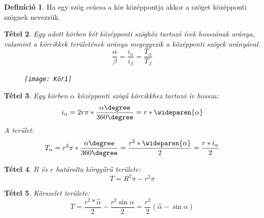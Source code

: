 \documentclass[twoside,12pt]{report}
\newtheorem{theorem}{Tétel}[section]
\theoremstyle{definition}
\newtheorem{definition}[theorem]{Definíció}
\begin{document}
	\begin{definition}
		Ha egy szög csúcsa a kör középpontja akkor a szöget középponti szögnek nevezzük.
	\end{definition}
	\begin{theorem}
		Egy adott körben két középponti szöghöz tartozó ívek hosszának aránya, valamint a körcikkek
		területének aránya megegyezik a középponti szögek arányával.
		\begin{equation*}
			\frac{\alpha}{\beta}=\frac{i_\alpha}{i_\beta}=\frac{T_\alpha}{T_\beta}
		\end{equation*}
		\begin{figure}[H]
			\centering
			\texttt{[image: Kör1]}
		\end{figure}
	\end{theorem}
	\begin{theorem}
		Egy körben $\alpha$ középponti szögű körcikkhez tartozó ív hossza:
		\begin{equation*}
			i_\alpha=2r\pi*\frac{\alpha\degree}{360\degree}=r*\wideparen{\alpha}
		\end{equation*}
		A terület:
		\begin{equation*}
			T_\alpha=r^2\pi*\frac{\alpha\degree}{360\degree}=\frac{r^2*\wideparen{\alpha}}{2}=\frac{r*i_\alpha}{2}
		\end{equation*}
	\end{theorem}
	\begin{theorem}
		$R$ és $r$ határolta körgyűrű területe:
		\begin{equation*}
			T=R^2\pi-r^2\pi
		\end{equation*}
	\end{theorem}
	\begin{theorem}
		Körszelet területe:
		\begin{equation*}
			T=\frac{r^2*\wideparen{\alpha}}{2}-\frac{r^2\sin\alpha}{2}=\frac{r^2}{2}\left(\wideparen{\alpha}-\sin\alpha\right)
		\end{equation*}
	\end{theorem}
\end{document}
